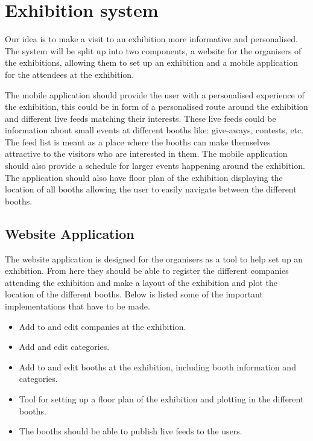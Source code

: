 \section{Exhibition system}\label{sec:exhibsystem}

Our idea is to make a visit to an exhibition more informative and personalised. The system will be split up into two components, a website for the organisers of the exhibitions, allowing them to set up an exhibition and a mobile application for the attendees at the exhibition.

The mobile application should provide the user with a personalised experience of the exhibition, this could be in form of a personalised route around the exhibition and different live feeds matching their interests. These live feeds could be information about small events at different booths like: give-aways, contests, etc. The feed list is meant as a place where the booths can make themselves attractive to the visitors who are interested in them. The mobile application should also provide a schedule for larger events happening around the exhibition. The application should also have floor plan of the exhibition displaying the location of all booths allowing the user to easily navigate between the different booths. 

\subsection*{Website Application}
The website application is designed for the organisers as a tool to help set up an exhibition. From here they should be able to register the different companies attending the exhibition and make a layout of the exhibition and plot the location of the different booths. Below is listed some of the important implementations that have to be made.
\begin{itemize}
\item Add to and edit companies at the exhibition.
\item Add and edit categories.
\item Add to and edit booths at the exhibition, including booth information and categories.
\item Tool for setting up a floor plan of the exhibition and plotting in the different booths.
\item The booths should be able to publish live feeds to the users.
\end{itemize}
